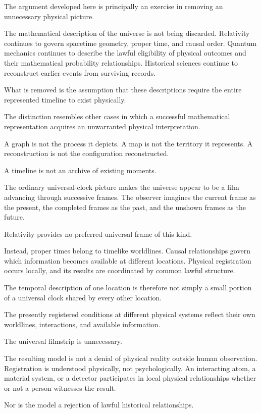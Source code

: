 \documentclass[12pt,onecolumn]{article}
\begin{document}
The argument developed here is principally an exercise in removing an unnecessary physical picture.

The mathematical description of the universe is not being discarded. Relativity continues to govern spacetime geometry, proper time, and causal order. Quantum mechanics continues to describe the lawful eligibility of physical outcomes and their mathematical probability relationships. Historical sciences continue to reconstruct earlier events from surviving records.

What is removed is the assumption that these descriptions require the entire represented timeline to exist physically.

The distinction resembles other cases in which a successful mathematical representation acquires an unwarranted physical interpretation.

A graph is not the process it depicts. A map is not the territory it represents. A reconstruction is not the configuration reconstructed.

A timeline is not an archive of existing moments.

The ordinary universal-clock picture makes the universe appear to be a film advancing through successive frames. The observer imagines the current frame as the present, the completed frames as the past, and the unshown frames as the future.

Relativity provides no preferred universal frame of this kind.

Instead, proper times belong to timelike worldlines. Causal relationships govern which information becomes available at different locations. Physical registration occurs locally, and its results are coordinated by common lawful structure.

The temporal description of one location is therefore not simply a small portion of a universal clock shared by every other location.

The presently registered conditions at different physical systems reflect their own worldlines, interactions, and available information.

The universal filmstrip is unnecessary.

The resulting model is not a denial of physical reality outside human observation. Registration is understood physically, not psychologically. An interacting atom, a material system, or a detector participates in local physical relationships whether or not a person witnesses the result.

Nor is the model a rejection of lawful historical relationships.
\end{document}
